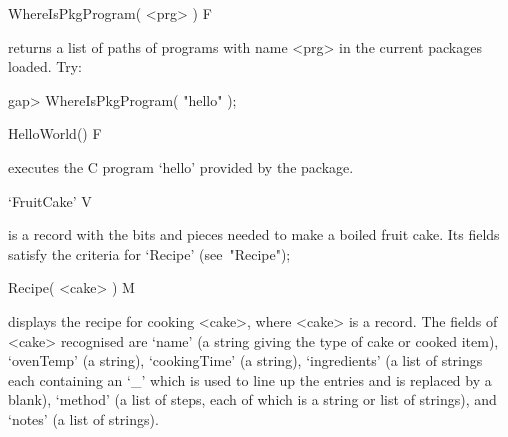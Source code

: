 \>WhereIsPkgProgram( <prg> ) F

returns a list of paths of  programs  with  name  <prg>  in  the  current
packages loaded. Try:

\beginexample
gap> WhereIsPkgProgram( "hello" );
\endexample

\>HelloWorld() F

executes the C program `hello' provided by the {\Example} package.

\>`FruitCake' V

is a record with the bits and pieces needed to make a boiled fruit  cake.
Its fields satisfy the criteria for `Recipe' (see~"Recipe");

\>Recipe( <cake> ) M

displays the recipe for cooking <cake>, where <cake>  is  a  record.  The
fields of <cake> recognised are `name' (a string giving the type of  cake
or  cooked  item),  `ovenTemp'  (a  string),  `cookingTime'  (a  string),
`ingredients' (a list of strings each containing an `_' which is used  to
line up the entries and is replaced by a  blank),  `method'  (a  list  of
steps, each of which is a string or list of strings), and `notes' (a list
of strings).



